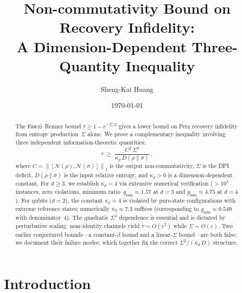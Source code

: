 \documentclass[prl,twocolumn,superscriptaddress,longbibliography,floatfix]{revtex4-2}
\newcommand{\chan}{\mathcal{N}}
\newcommand{\norm}[1]{\left\|#1\right\|}
\newcommand{\tauasym}{\tau}
\newcommand{\kd}{\kappa_d}
\begin{document}
\title{Non-commutativity Bound on Recovery Infidelity:\\
A Dimension-Dependent Three-Quantity Inequality}

\author{Sheng-Kai Huang}

\date{\today}

\begin{abstract}
The Fawzi--Renner bound $\tauasym \geq 1 - e^{-\Sigma/2}$
gives a lower bound on Petz recovery infidelity from
entropy production~$\Sigma$ alone.
We prove a complementary inequality involving three
independent information-theoretic quantities:
\begin{equation*}
\tauasym \;\geq\; \frac{C^2\, \Sigma^2}{\kd\, D(\rho\|\sigma)}\,,
\end{equation*}
where $C = \norm{[\chan(\rho),\chan(\sigma)]}_1$ is the output
non-commutativity, $\Sigma$ is the DPI deficit,
$D(\rho\|\sigma)$ is the input relative entropy, and
$\kd > 0$ is a dimension-dependent constant.
For $d \geq 3$, we establish $\kd = 4$ via extensive
numerical verification ($>10^5$ instances, zero violations,
minimum ratio~$g_{\min} \approx 1.57$ at $d = 3$ and
$g_{\min} \approx 4.75$ at $d = 4$).
For qubits ($d = 2$), the constant $\kd = 4$ is
violated by pure-state configurations with extreme
reference states; numerically $\kappa_2 \approx 7.3$
suffices (corresponding to $g_{\min} \approx 0.549$
with denominator~$4$).
The quadratic $\Sigma^2$ dependence is essential and is
dictated by perturbative scaling: near-identity channels
yield $\tauasym \sim O(\varepsilon^2)$ while
$\Sigma \sim O(\varepsilon)$.
Two earlier conjectured bounds---a constant-$\beta$
bound and a linear-$\Sigma$ bound---are both false;
we document their failure modes, which together fix the
correct $\Sigma^2/(\kd\,D)$ structure.
\end{abstract}

\maketitle

\section{Introduction}
\label{sec:intro}
\end{document}
